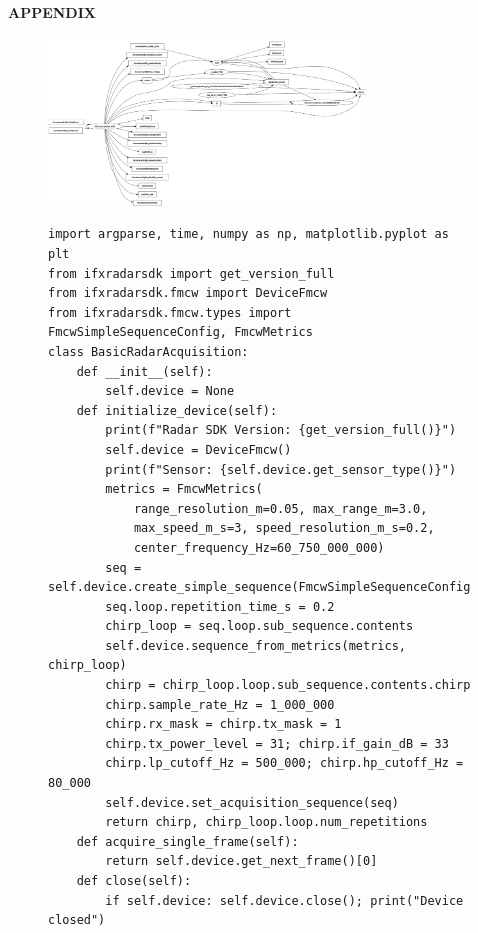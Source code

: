 
\appendix
\newpage
\null\vspace{\fill} %

\begin{center}
	{\fontsize{14}{14}\selectfont \textbf{APPENDIX}}
\end{center}
\vspace{\fill}\null %

\newpage
{}
\begin{figure}[H]
    \centering
    \includegraphics[angle=90, width=0.75\textwidth]{Src/images/ros2 topics.png}
    \label{fig:appendix_rotated_image}
\end{figure}




\newpage
{}

\begin{figure}[H]
\centering
\begin{verbatim}
import argparse, time, numpy as np, matplotlib.pyplot as plt
from ifxradarsdk import get_version_full
from ifxradarsdk.fmcw import DeviceFmcw
from ifxradarsdk.fmcw.types import FmcwSimpleSequenceConfig, FmcwMetrics
class BasicRadarAcquisition:
    def __init__(self):
        self.device = None
    def initialize_device(self):
        print(f"Radar SDK Version: {get_version_full()}")
        self.device = DeviceFmcw()
        print(f"Sensor: {self.device.get_sensor_type()}")
        metrics = FmcwMetrics(
            range_resolution_m=0.05, max_range_m=3.0,
            max_speed_m_s=3, speed_resolution_m_s=0.2,
            center_frequency_Hz=60_750_000_000)
        seq = self.device.create_simple_sequence(FmcwSimpleSequenceConfig())
        seq.loop.repetition_time_s = 0.2
        chirp_loop = seq.loop.sub_sequence.contents
        self.device.sequence_from_metrics(metrics, chirp_loop)
        chirp = chirp_loop.loop.sub_sequence.contents.chirp
        chirp.sample_rate_Hz = 1_000_000
        chirp.rx_mask = chirp.tx_mask = 1
        chirp.tx_power_level = 31; chirp.if_gain_dB = 33
        chirp.lp_cutoff_Hz = 500_000; chirp.hp_cutoff_Hz = 80_000
        self.device.set_acquisition_sequence(seq)
        return chirp, chirp_loop.loop.num_repetitions
    def acquire_single_frame(self):
        return self.device.get_next_frame()[0]
    def close(self):
        if self.device: self.device.close(); print("Device closed")
\end{verbatim}
\end{figure}

